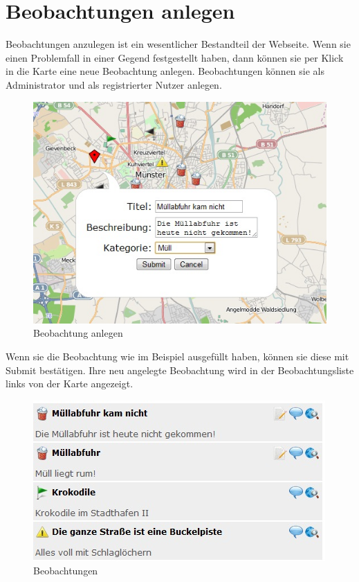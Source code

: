 \documentclass[a4paper,11pt]{scrartcl}
\begin{document}
\newpage


\section{Beobachtungen anlegen}
Beobachtungen anzulegen ist ein wesentlicher Bestandteil der Webseite. Wenn sie einen Problemfall in einer Gegend festgestellt haben, dann können sie per Klick in die Karte eine neue Beobachtung anlegen. Beobachtungen können sie als Administrator und als registrierter Nutzer anlegen.
\begin{figure}[h]
\centering
\includegraphics[width = 10 cm]{img/beobachtunganlegen}
\caption{Beobachtung anlegen}
\label{Beobachtung anlegen}
\end{figure}

Wenn sie die Beobachtung wie im Beispiel ausgefüllt haben, können sie diese mit Submit bestätigen. Ihre neu angelegte Beobachtung wird in der Beobachtungsliste links von der Karte angezeigt.
\begin{figure}[h]
\centering
\includegraphics[width = 10 cm]{img/beobachtungsliste}
\caption{Beobachtungen}
\label{Beobachtungsliste}
\end{figure}


\newpage
\end{document}
